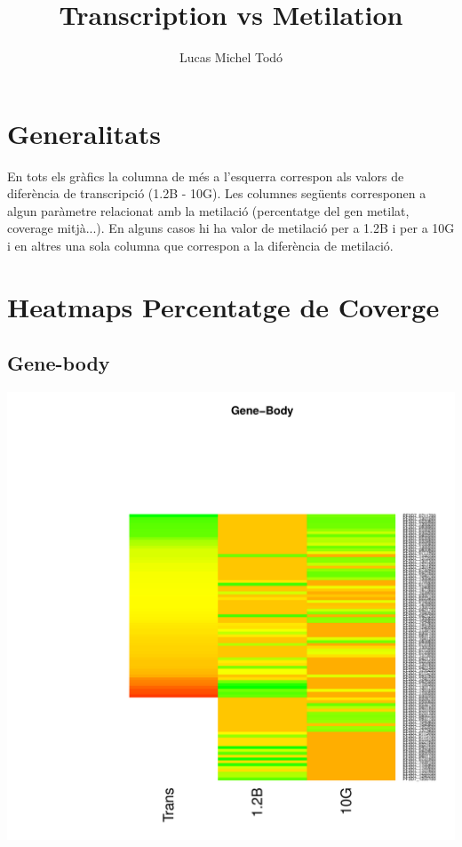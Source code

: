 \documentclass{article}\usepackage[]{graphicx}\usepackage[]{color}
\newenvironment{knitrout}{}{} %
\begin{document}
\title{Transcription vs Metilation}
\author{Lucas Michel Todó}
\maketitle
\tableofcontents
\clearpage


\section{Generalitats}
En tots els gràfics la columna de més a l'esquerra correspon als valors de diferència de transcripció (1.2B - 10G). Les columnes següents corresponen a algun paràmetre relacionat amb la metilació (percentatge del gen metilat, coverage mitjà...). En alguns casos hi ha valor de metilació per a 1.2B i per a 10G i en altres una sola columna que correspon a la diferència de metilació.
\section{Heatmaps Percentatge de Coverge}
\subsection{Gene-body}
\begin{knitrout}
\color{fgcolor}

{\centering \includegraphics[width=.9\linewidth]{figure/minimal-heatmap_gene-1} 

}



\end{knitrout}
\clearpage
\end{document}
